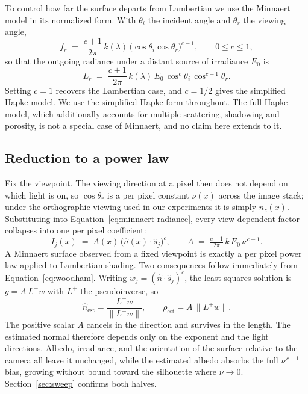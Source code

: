 \documentclass[10pt,twocolumn,letterpaper]{article}
\begin{document}
To control how far the surface departs from Lambertian we use the Minnaert
model \cite{minnaert1941} in its normalized form. With $\theta_i$ the incident
angle and $\theta_r$ the viewing angle,
%
\begin{equation}
  f_r \;=\; \frac{c+1}{2\pi}\,k(\lambda)\,
            \bigl(\cos\theta_i\cos\theta_r\bigr)^{c-1},
  \qquad 0 \leq c \leq 1,
  \label{eq:minnaert}
\end{equation}
%
so that the outgoing radiance under a distant source of irradiance $E_0$ is
%
\begin{equation}
  L_r \;=\; \frac{c+1}{2\pi}\,k(\lambda)\,E_0\,
            \cos^{c}\theta_i\,\cos^{c-1}\theta_r .
  \label{eq:minnaert-radiance}
\end{equation}
%
Setting $c = 1$ recovers the Lambertian case, and $c = 1/2$ gives the simplified
Hapke model. We use the simplified Hapke form throughout. The full Hapke model,
which additionally accounts for multiple scattering, shadowing and porosity, is
not a special case of Minnaert, and no claim here extends to it.

\subsection{Reduction to a power law}
\label{sec:reduction}

Fix the viewpoint. The viewing direction at a pixel then does not depend on
which light is on, so $\cos\theta_r$ is a per pixel constant $\nu(x)$ across
the image stack; under the orthographic viewing used in our experiments it is
simply $n_z(x)$. Substituting into Equation~\eqref{eq:minnaert-radiance}, every
view dependent factor collapses into one per pixel coefficient:
%
\begin{equation}
  I_j(x) \;=\; A(x)\,\bigl(\hat{n}(x)\cdot\hat{s}_j\bigr)^{c},
  \qquad
  A \;=\; \tfrac{c+1}{2\pi}\,k\,E_0\,\nu^{\,c-1}.
  \label{eq:powerlaw}
\end{equation}
%
A Minnaert surface observed from a fixed viewpoint is exactly a per pixel power
law applied to Lambertian shading. Two consequences follow immediately from
Equation~\eqref{eq:woodham}. Writing $w_j = (\hat{n}\cdot\hat{s}_j)^{c}$, the
least squares solution is $g = A\,L^{+}w$ with $L^{+}$ the pseudoinverse, so
%
\begin{equation}
  \hat{n}_{\text{est}} = \frac{L^{+}w}{\lVert L^{+}w \rVert},
  \qquad
  \rho_{\text{est}} = A\,\lVert L^{+}w \rVert.
  \label{eq:split}
\end{equation}
%
The positive scalar $A$ cancels in the direction and survives in the length.
The estimated normal therefore depends only on the exponent and the light
directions. Albedo, irradiance, and the orientation of the surface relative to
the camera all leave it unchanged, while the estimated albedo absorbs the full
$\nu^{\,c-1}$ bias, growing without bound toward the silhouette where
$\nu \to 0$. Section~\ref{sec:sweep} confirms both halves.
\end{document}

